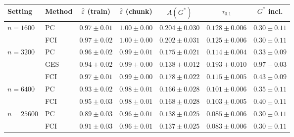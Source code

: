 \begin{tabular}{llccccc}
\toprule
Setting & Method & $\hat\varepsilon$ (train) & $\hat\varepsilon$ (chunk) & $A(G^\ast)$ & $\tau_{0.1}$ & $G^\ast$ incl. \\
\midrule
$n{=}1600$ & PC & $0.97\pm0.01$ & $1.00\pm0.00$ & $0.204\pm0.030$ & $0.128\pm0.006$ & $0.30\pm0.11$ \\
 & FCI & $0.97\pm0.02$ & $1.00\pm0.00$ & $0.202\pm0.031$ & $0.125\pm0.006$ & $0.30\pm0.11$ \\
$n{=}3200$ & PC & $0.96\pm0.02$ & $0.99\pm0.01$ & $0.175\pm0.021$ & $0.114\pm0.004$ & $0.33\pm0.09$ \\
 & GES & $0.94\pm0.02$ & $0.99\pm0.00$ & $0.138\pm0.012$ & $0.193\pm0.010$ & $0.97\pm0.03$ \\
 & FCI & $0.97\pm0.01$ & $0.99\pm0.00$ & $0.178\pm0.022$ & $0.115\pm0.005$ & $0.43\pm0.09$ \\
$n{=}6400$ & PC & $0.93\pm0.02$ & $0.98\pm0.01$ & $0.166\pm0.028$ & $0.101\pm0.006$ & $0.35\pm0.11$ \\
 & FCI & $0.95\pm0.03$ & $0.98\pm0.01$ & $0.168\pm0.028$ & $0.103\pm0.005$ & $0.40\pm0.11$ \\
$n{=}25600$ & PC & $0.89\pm0.03$ & $0.96\pm0.01$ & $0.138\pm0.025$ & $0.085\pm0.006$ & $0.30\pm0.11$ \\
 & FCI & $0.91\pm0.03$ & $0.96\pm0.01$ & $0.137\pm0.025$ & $0.083\pm0.006$ & $0.30\pm0.11$ \\
\bottomrule
\end{tabular}
